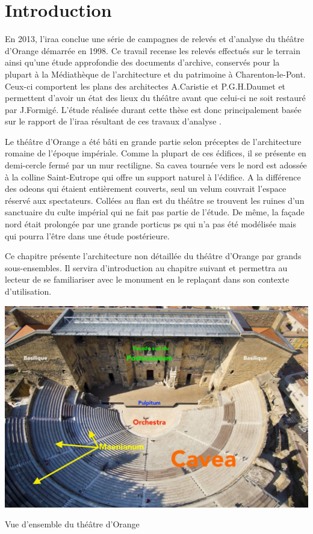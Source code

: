 		\section{Introduction}
		
		En 2013, l'\gls{iraa} conclue une série de campagnes de relevés et d'analyse du théâtre d'Orange démarrée en 1998. Ce travail recense les relevés effectués sur le terrain ainsi qu'une étude approfondie des documents d'archive, conservés pour la plupart à la Médiathèque de l'architecture et du patrimoine à Charenton-le-Pont. Ceux-ci comportent les plans des architectes A.Caristie et P.G.H.Daumet et permettent d'avoir un état des lieux du théâtre avant que celui-ci ne soit restauré par J.Formigé. L'étude réalisée durant cette thèse est donc principalement basée sur le rapport de l'\gls{iraa} résultant de ces travaux d'analyse \cite{orangeTxt}\cite{orangePl}.
		
		Le théâtre d'Orange a été bâti en grande partie selon préceptes de l'architecture romaine de l'époque impériale. Comme la plupart de ces édifices, il se présente en demi-cercle fermé par un mur rectiligne. Sa \gls{cavea} tournée vers le nord est adossée à la colline Saint-Eutrope qui offre un support naturel à l'édifice. A la différence des \glspl{odeon} qui étaient entièrement couverts, seul un \gls{velum} couvrait l'espace réservé aux spectateurs. Collées au flan est du théâtre se trouvent les ruines d'un sanctuaire du culte impérial qui ne fait pas partie de l'étude. De même, la façade nord était prolongée par une grande \gls{porticus ps} qui n'a pas été modélisée mais qui pourra l'être dans une étude postérieure. 
		
		Ce chapitre présente l'architecture non détaillée du théâtre d'Orange par grands sous-ensembles. Il servira d'introduction au chapitre suivant et permettra au lecteur de se familiariser avec le monument en le replaçant dans son contexte d'utilisation.

	\begin{figureth}
			\includegraphics[width=\linewidth]{images/vuensemble}
			\caption[Vue d'ensemble du théâtre d'Orange]{Vue d'ensemble du théâtre d'Orange \footnotemark}
	\end{figureth}

